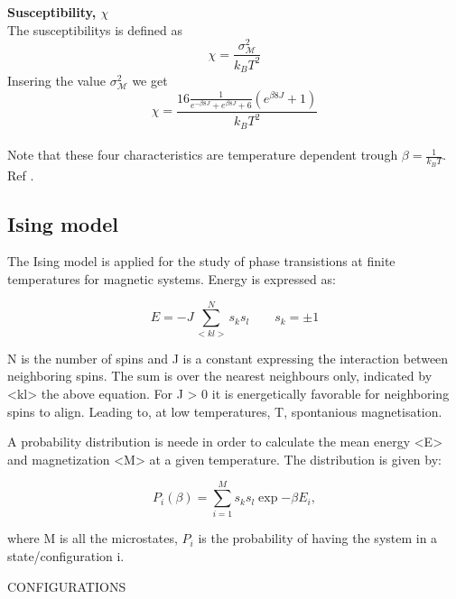 \documentclass[../main.tex]{subfiles}
\begin{document}
    \textbf{Susceptibility, $\chi$}\\
    The susceptibilitys is defined as
    \[\chi = \frac{\sigma^2_\mathcal{M}}{k_B T^2}\]
    Insering the value $\sigma^2_\mathcal{M}$ we get
    \[\chi = \frac{16 \frac{1}{e^{-\beta 8J} + e^{\beta 8J} + 6} \left(e^{\beta 8J} + 1\right)}{k_B T^2}\]\\

    \noindent Note that these four characteristics are temperature dependent trough $\beta = \frac{1}{k_B T}$.\\
    Ref \cite{Mortenstatphys2019}.


    \subsection{Ising model}
    The Ising model is applied for the study of phase transistions at finite temperatures
    for magnetic systems. Energy is expressed as:

    \begin{equation}
      E = -J \sum  _{<kl>}^N s_ks_l \qquad s_k = \pm 1
    \end{equation}

    N is the number of spins and J is a constant expressing the interaction between neighboring spins. The sum is over the nearest neighbours only, indicated by <kl> the above equation. For J > 0 it is energetically favorable for neighboring spins to align. Leading to, at low temperatures, T, spontanious magnetisation.

    A probability distribution is neede in order to calculate the mean energy <E> and magnetization <M> at a given temperature. The distribution is given by:

    \begin{equation}
      P_i(\beta)=  \sum  _{i = 1}^M s_ks_l \exp{-\beta E_i},
    \end{equation}

    where M is all the microstates, $P_i$ is the probability of having the system in a state/configuration i.

    CONFIGURATIONS
\end{document}
